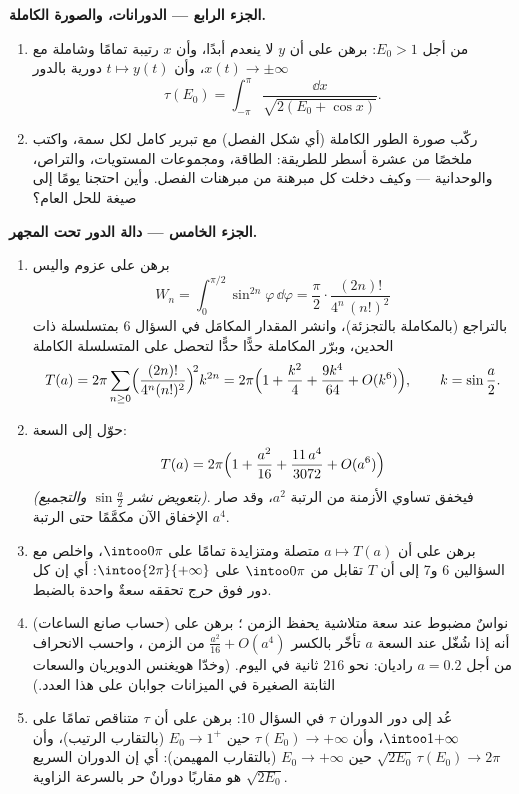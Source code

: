 \begin{problem}
\medskip
\noindent\textbf{الجزء الرابع --- الدورانات، والصورة
الكاملة.}
\begin{enumerate}[resume]
  \item من أجل $E_0 > 1$: برهن على أن $y$ لا ينعدم أبدًا، وأن
        $x$ رتيبة تمامًا وشاملة مع $x(t) \to
        \pm\infty$، وأن
        $t \mapsto y(t)$ دورية بالدور
        \[
        \tau(E_0) = \int_{-\pi}^{\pi}
        \frac{\dd x}{\sqrt{2(E_0 + \cos x)}} .
        \]
  \item ركّب صورة الطور الكاملة (أي شكل الفصل) مع تبرير كامل
        لكل سمة، واكتب ملخصًا من عشرة أسطر للطريقة: الطاقة،
        ومجموعات المستويات، والتراص، والوحدانية --- وكيف دخلت
        كل مبرهنة من مبرهنات الفصل. وأين احتجنا يومًا إلى صيغة
        للحل العام؟
\end{enumerate}

\medskip
\noindent\textbf{الجزء الخامس --- دالة الدور تحت المجهر.}
\begin{enumerate}[resume]
  \item برهن على عزوم واليس
        \[
        W_n = \int_0^{\pi/2}\sin^{2n}\varphi\,\dd\varphi
        = \frac\pi2\cdot\frac{(2n)!}{4^n\,(n!)^2}
        \]
        بالتراجع (بالمكاملة بالتجزئة)، وانشر المقدار المكامَل
        في السؤال 6 بمتسلسلة ذات الحدين، وبرّر المكاملة حدًّا
        حدًّا لتحصل على المتسلسلة الكاملة
        \[
        T(a) = 2\pi\sum_{n\geq0}
        \Bigl(\frac{(2n)!}{4^n(n!)^2}\Bigr)^{\!2}k^{2n}
        = 2\pi\Bigl(1 + \frac{k^2}4 + \frac{9k^4}{64}
        + O(k^6)\Bigr),
        \qquad k = \sin\frac a2 .
        \]
  \item حوّل إلى السعة:
        \[
        T(a) = 2\pi\Bigl(1 + \frac{a^2}{16} +
        \frac{11\,a^4}{3072} + O(a^6)\Bigr)
        \]
        \emph{(بتعويض نشر $\sin\frac a2$ والتجميع)}. فيخفق
        تساوي الأزمنة من الرتبة $a^2$، وقد صار الإخفاق الآن
        مكمَّمًا حتى الرتبة $a^4$.
  \item برهن على أن $a \mapsto T(a)$ متصلة ومتزايدة تمامًا على
        $\intoo0\pi$، واخلص مع السؤالين 6 و7 إلى أن $T$ تقابل
        من $\intoo0\pi$ على $\intoo{2\pi}{+\infty}$: أي إن كل دور فوق حرج
        تحققه سعةٌ واحدة بالضبط.
  \item (حساب صانع الساعات) نواسٌ مضبوط عند سعة متلاشية يحفظ
        الزمن ؛ برهن على أنه إذا شُغّل عند السعة $a$
        تأخّر بالكسر $\frac{a^2}{16} + O(a^4)$ من الزمن ، واحسب الانحراف
        من أجل $a = 0.2$ راديان: نحو $216$ ثانية في اليوم.
        (وخدّا هويغنس الدويريان والسعات الثابتة الصغيرة في
        الميزانات جوابان على هذا العدد.)
  \item عُد إلى دور الدوران $\tau$ في السؤال 10: برهن على أن
        $\tau$ متناقص تمامًا على $\intoo1{+\infty}$، وأن $\tau(E_0) \to +\infty$ حين
        $E_0 \to 1^+$ (بالتقارب الرتيب)، وأن $\sqrt{2E_0}\,\tau(E_0) \to 2\pi$ حين
        $E_0 \to
        +\infty$ (بالتقارب المهيمن): أي إن الدوران السريع هو
        مقاربًا دورانٌ حر بالسرعة الزاوية $\sqrt{2E_0}$.
\end{enumerate}


\end{problem}
